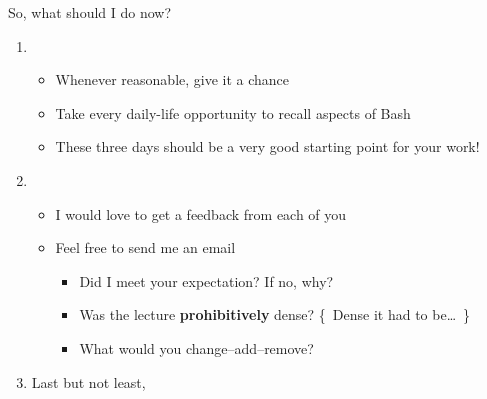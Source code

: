 \begin{frame}{So, what should I do now?}
    \vspace{-2mm}
    \begin{enumerate}
        \setlength{\itemsep}{1mm}
        \item<1-> 
                  \begin{itemize}
                    \item Whenever reasonable, give it a chance
                    \item Take every daily-life opportunity to recall aspects of Bash
                    \item These three days should be a very good starting point for your work!
                  \end{itemize}
        \item<2-> 
                  \begin{itemize}
                      \item I would love to get a feedback from each of you
                      \item Feel free to send me an email \,
                            \begin{itemize}
                                \item Did I meet your expectation? If no, why?
                                \item Was the lecture \textbf{prohibitively} dense? {\tiny\{~Dense it had to be\ldots~\}}
                                \item What would you change--add--remove?
                            \end{itemize}
                  \end{itemize}
        \item<3-> Last but not least,  $\;$
    \end{enumerate}
    
\end{frame}